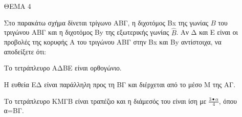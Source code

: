
ΘΕΜΑ 4

Στο παρακάτω σχήμα δίνεται τρίγωνο ΑΒΓ, η διχοτόμος Βx της γωνίας $\widehat{Β}$ του τριγώνου ΑΒΓ και η διχοτόμος Βy της εξωτερικής γωνίας $\widehat{Β}$. Αν Δ και Ε είναι οι προβολές της κορυφής Α του τριγώνου ΑΒΓ στην Βx και Βy αντίστοιχα, να αποδείξετε ότι:

\begin{alist}
\item Το τετράπλευρο ΑΔΒΕ είναι ορθογώνιο. 

\item Η ευθεία ΕΔ είναι παράλληλη προς τη ΒΓ και διέρχεται από το μέσο Μ της ΑΓ.


\item Το τετράπλευρο ΚΜΓΒ είναι τραπέζιο και η διάμεσός του είναι ίση με $\frac{3 \bullet \alpha}{4}$, όπου α=ΒΓ. 


\end{alist}
